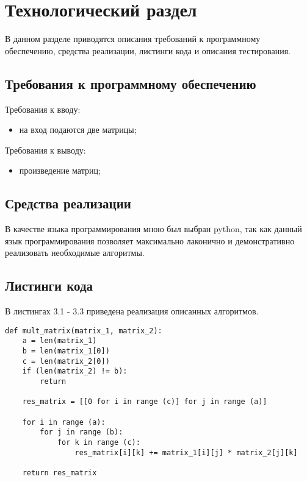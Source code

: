\chapter{Технологический раздел}
\label{cha:impl}

В данном разделе приводятся описания требований к программному обеспечению, средства реализации, листинги кода и описания тестирования.
\section{Требования к программному обеспечению}
Требования к вводу:
\begin{itemize}
    \item на вход подаются две матрицы;
\end{itemize}
Требования к выводу:
\begin{itemize}
    \item произведение матриц;
\end{itemize}
\section{Средства реализации}
В качестве языка программирования мною был выбран python, так как данный язык программирования позволяет максимально лаконично и демонстративно реализовать необходимые алгоритмы.
\section{Листинги кода}

В листингах 3.1 - 3.3 приведена реализация описанных алгоритмов.
\begin{lstlisting}[caption=Классическое умножение матриц]
def mult_matrix(matrix_1, matrix_2):
    a = len(matrix_1)
    b = len(matrix_1[0])
    c = len(matrix_2[0])
    if (len(matrix_2) != b):
        return

    res_matrix = [[0 for i in range (c)] for j in range (a)]

    for i in range (a):
        for j in range (b):
            for k in range (c):
                res_matrix[i][k] += matrix_1[i][j] * matrix_2[j][k]

    return res_matrix
\end{lstlisting}

